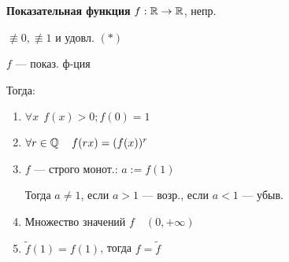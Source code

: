 \begin{definition}
    \textbf{Показательная функция} $f:\operatorname*{\mathbb{R}}\to\operatorname*{\mathbb{R}}$, непр.

    $\not\equiv 0, \not\equiv 1$ и удовл. $(*)$
\end{definition}
\begin{theorem}
    $f$ --- показ. ф-ция

    Тогда:
    \begin{enumerate}
        \item $\forall x \ \ f(x)>0; f(0)=1$
        \item $\forall r \in\operatorname*{\mathbb{Q}} \quad f(rx)=(f(x))^r$
        \item $f$ --- строго монот.: $a:=f(1)$
        
        Тогда $a\not=1$, если $a>1$ --- возр., если $a<1$ --- убыв.

        \item Множество значений $f \quad (0, +\infty)$
        \item $\tilde f(1)=f(1)$, тогда $f=\tilde f$
    \end{enumerate}
\end{theorem}
